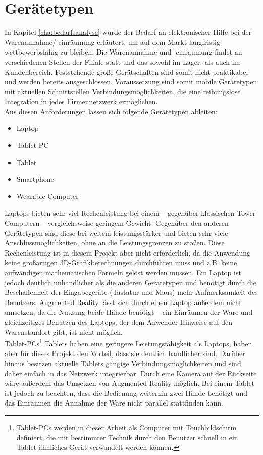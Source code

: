 \section{Gerätetypen}
\label{sec:geraete}
In Kapitel \ref{cha:bedarfsanalyse}  wurde der Bedarf an elektronischer Hilfe bei der Warenannahme/-einräumung erläutert, um auf dem Markt langfristig wettbewerbsfähig zu bleiben. Die Warenannahme und -einräumung findet an verschiedenen Stellen der Filiale statt und das sowohl im Lager- als auch im Kundenbereich. Feststehende große Gerätschaften sind somit nicht praktikabel und werden bereits ausgeschlossen. Voraussetzung sind somit mobile Gerätetypen mit aktuellen Schnittstellen \bzw Verbindungsmöglichkeiten, die eine reibungslose Integration in jedes Firmennetzwerk ermöglichen.\\
Aus diesen Anforderungen lassen sich folgende Gerätetypen ableiten:
\begin{itemize}
	\item Laptop
	\item Tablet-PC
	\item Tablet
	\item Smartphone
	\item Wearable Computer
\end{itemize}
Laptops bieten sehr viel Rechenleistung bei einem -- gegenüber klassischen Tower-Computern -- vergleichsweise geringem Gewicht. Gegenüber den anderen Gerätetypen sind diese bei weitem leistungsstärker und bieten sehr viele Anschlussmöglichkeiten, ohne an die Leistungsgrenzen zu stoßen. Diese Rechenleistung ist in diesem Projekt aber nicht erforderlich, da die Anwendung keine großartigen \acs{3D}-Grafikberechnungen durchführen muss und z.B. keine aufwändigen mathematischen Formeln gelöst werden müssen. Ein Laptop ist jedoch deutlich unhandlicher als die anderen Gerätetypen und benötigt durch die Beschaffenheit der Eingabegeräte (Tastatur und Maus) mehr Aufmerksamkeit des Benutzers. Augmented Reality lässt sich durch einen Laptop außerdem nicht umsetzen, da die Nutzung beide Hände benötigt -- ein Einräumen der Ware und gleichzeitiges Benutzen des Laptops, der dem Anwender Hinweise auf den Warenstandort gibt, ist nicht möglich.\\

Tablet-PCs\footnote{Tablet-PCs werden in dieser Arbeit als Computer mit Touchbildschirm definiert, die mit bestimmter Technik durch den Benutzer schnell in ein Tablet-ähnliches Gerät verwandelt werden können.} \bzw Tablets haben eine geringere Leistungsfähigkeit als Laptops, haben aber für dieses Projekt den Vorteil, dass sie deutlich handlicher sind. Darüber hinaus besitzen aktuelle Tablets gängige Verbindungsmöglichkeiten und sind daher einfach in das Netzwerk integrierbar. Durch eine Kamera auf der Rückseite wäre außerdem das Umsetzen von Augmented Reality möglich. Bei einem Tablet ist jedoch zu beachten, dass die Bedienung weiterhin zwei Hände benötigt und das Einräumen \bzw die Annahme der Ware nicht parallel stattfinden kann.\\


